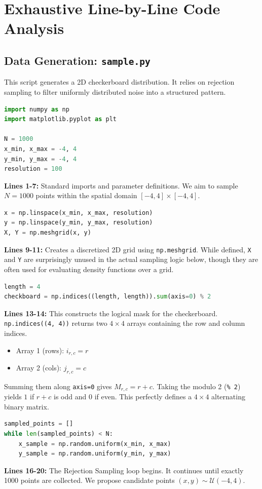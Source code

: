 \documentclass[12pt]{article}
\begin{document}
\newpage
\section{Exhaustive Line-by-Line Code Analysis}

\subsection{Data Generation: \texttt{sample.py}}
This script generates a 2D checkerboard distribution. It relies on rejection sampling to filter uniformly distributed noise into a structured pattern.

\begin{lstlisting}[language=Python]
import numpy as np
import matplotlib.pyplot as plt

N = 1000
x_min, x_max = -4, 4
y_min, y_max = -4, 4
resolution = 100
\end{lstlisting}
\textbf{Lines 1-7:} Standard imports and parameter definitions. We aim to sample $N=1000$ points within the spatial domain $[-4, 4] \times [-4, 4]$.

\begin{lstlisting}[language=Python]
x = np.linspace(x_min, x_max, resolution)
y = np.linspace(y_min, y_max, resolution)
X, Y = np.meshgrid(x, y)
\end{lstlisting}
\textbf{Lines 9-11:} Creates a discretized 2D grid using \texttt{np.meshgrid}. While defined, \texttt{X} and \texttt{Y} are surprisingly unused in the actual sampling logic below, though they are often used for evaluating density functions over a grid.

\begin{lstlisting}[language=Python]
length = 4
checkboard = np.indices((length, length)).sum(axis=0) % 2
\end{lstlisting}
\textbf{Lines 13-14:} This constructs the logical mask for the checkerboard. \texttt{np.indices((4, 4))} returns two $4 \times 4$ arrays containing the row and column indices. 
\begin{itemize}
    \item Array 1 (rows): $i_{r,c} = r$
    \item Array 2 (cols): $j_{r,c} = c$
\end{itemize}
Summing them along \texttt{axis=0} gives $M_{r,c} = r + c$. Taking the modulo 2 (\texttt{\% 2}) yields $1$ if $r+c$ is odd and $0$ if even. This perfectly defines a $4 \times 4$ alternating binary matrix.

\begin{lstlisting}[language=Python]
sampled_points = []
while len(sampled_points) < N:
    x_sample = np.random.uniform(x_min, x_max)
    y_sample = np.random.uniform(y_min, y_max)
\end{lstlisting}
\textbf{Lines 16-20:} The Rejection Sampling loop begins. It continues until exactly 1000 points are collected. We propose candidate points $(x, y) \sim \mathcal{U}(-4, 4)$.
\end{document}
